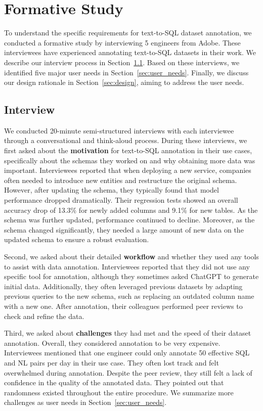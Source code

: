 \section{Formative Study}

To understand the specific requirements for text-to-SQL dataset annotation, we conducted a formative study by interviewing 5 engineers from Adobe. These interviewees have experienced annotating text-to-SQL datasets in their work.
We describe our interview process in Section~\ref{sec:interview}. Based on these interviews, we identified five major user needs in Section~\ref{sec:user_needs}. 
Finally, we discuss our design rationale in Section~\ref{sec:design}, aiming to address the user needs.

\subsection{Interview}
\label{sec:interview}

We conducted 20-minute semi-structured interviews with each interviewee through a conversational and think-aloud process. 
During these interviews, we first asked about the \textbf{motivation} for text-to-SQL annotation in their use cases, specifically about the schemas they worked on and why obtaining more data was important.
Interviewees reported that when deploying a new service, companies often needed to introduce new entities and restructure the original schema.
However, after updating the schema, they typically found that model performance dropped dramatically. Their regression tests showed an overall accuracy drop of 13.3\% for newly added columns and 9.1\% for new tables. As the schema was further updated, performance continued to decline. Moreover, as the schema changed significantly, they needed a large amount of new data on the updated schema to ensure a robust evaluation.

Second, we asked about their detailed \textbf{workflow} and whether they used any tools to assist with data annotation. Interviewees reported that they did not use any specific tool for annotation, although they sometimes asked ChatGPT to generate initial data. 
Additionally, they often leveraged previous datasets by adapting previous queries to the new schema, such as replacing an outdated column name with a new one.
After annotation, their colleagues performed peer reviews to check and refine the data.





Third, we asked about \textbf{challenges} they had met and the speed of their dataset annotation. Overall, they considered annotation to be very expensive. 
Interviewees mentioned that one engineer could only annotate 50 effective SQL and NL pairs per day in their use case. 
They often lost track and felt overwhelmed during annotation. 
Despite the peer review, they still felt a lack of confidence in the quality of the annotated data. 
They pointed out that randomness existed throughout the entire procedure. 
We summarize more challenges as user needs in Section~\ref{sec:user_needs}.






